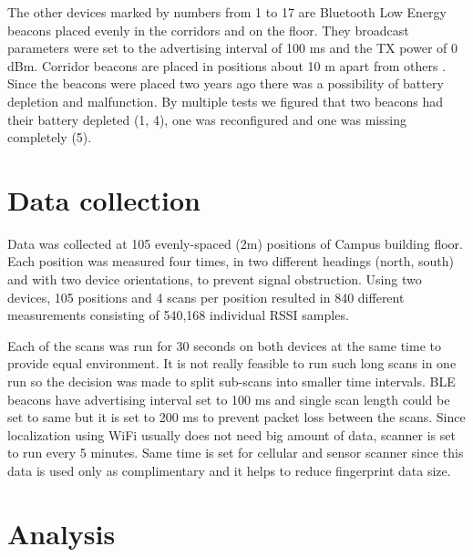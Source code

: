 The other devices marked by numbers from 1 to 17 are Bluetooth Low Energy beacons placed evenly in the corridors and on the floor. They broadcast parameters were set to the advertising interval of 100 ms and the TX power of 0 dBm. Corridor beacons are placed in positions about 10 m apart from others \cite{IILUBLEB}. Since the beacons were placed two years ago there was a possibility of battery depletion and malfunction. By multiple tests we figured that two beacons had their battery depleted (1, 4), one was reconfigured and one was missing completely (5).

\section{Data collection}\label{sec:DataCollection}
Data was collected at 105 evenly-spaced (2m) positions of Campus building floor. Each position was measured four times, in two different headings (north, south) and with two device orientations, to prevent signal obstruction. Using two devices, 105 positions and 4 scans per position resulted in 840 different measurements consisting of 540,168 individual RSSI samples.

Each of the scans was run for 30 seconds on both devices at the same time to provide equal environment. It is not really feasible to run such long scans in one run so the decision was made to split sub-scans into smaller time intervals. BLE beacons have advertising interval set to 100 ms and single scan length could be set to same but it is set to 200 ms to prevent packet loss between the scans. Since localization using WiFi usually does not need big amount of data, scanner is set to run every 5 minutes. Same time is set for cellular and sensor scanner since this data is used only as complimentary and it helps to reduce fingerprint data size.

\section{Analysis}\label{sec:Analysis}